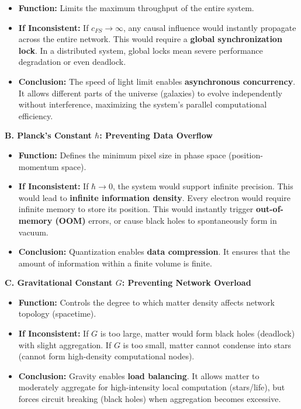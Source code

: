 \begin{itemize}
\item \textbf{Function:} Limits the maximum throughput of the entire system.

\item \textbf{If Inconsistent:} If \textbf{$c_{FS} \to \infty$}, any causal influence would instantly propagate across the entire network. This would require a \textbf{global synchronization lock}. In a distributed system, global locks mean severe performance degradation or even deadlock.

\item \textbf{Conclusion:} The speed of light limit enables \textbf{asynchronous concurrency}. It allows different parts of the universe (galaxies) to evolve independently without interference, maximizing the system's parallel computational efficiency.
\end{itemize}

\textbf{B. Planck's Constant $\hbar$: Preventing Data Overflow}

\begin{itemize}
\item \textbf{Function:} Defines the minimum pixel size in phase space (position-momentum space).

\item \textbf{If Inconsistent:} If \textbf{$\hbar \to 0$}, the system would support infinite precision. This would lead to \textbf{infinite information density}. Every electron would require infinite memory to store its position. This would instantly trigger \textbf{out-of-memory (OOM)} errors, or cause black holes to spontaneously form in vacuum.

\item \textbf{Conclusion:} Quantization enables \textbf{data compression}. It ensures that the amount of information within a finite volume is finite.
\end{itemize}

\textbf{C. Gravitational Constant $G$: Preventing Network Overload}

\begin{itemize}
\item \textbf{Function:} Controls the degree to which matter density affects network topology (spacetime).

\item \textbf{If Inconsistent:} If \textbf{$G$} is too large, matter would form black holes (deadlock) with slight aggregation. If \textbf{$G$} is too small, matter cannot condense into stars (cannot form high-density computational nodes).

\item \textbf{Conclusion:} Gravity enables \textbf{load balancing}. It allows matter to moderately aggregate for high-intensity local computation (stars/life), but forces circuit breaking (black holes) when aggregation becomes excessive.
\end{itemize}

